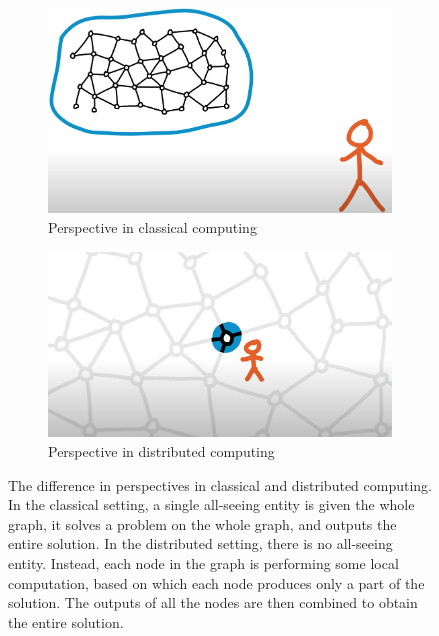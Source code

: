 \begin{figure}
  \centering
  \begin{subfigure}[b]{0.49\textwidth}
      \centering
      \includegraphics[width=\textwidth]{images/classical-computing.png}
      \caption{Perspective in classical computing}
      \label{fig:classical-computing}
  \end{subfigure}
  \hfill
  \begin{subfigure}[b]{0.49\textwidth}
      \centering
      \includegraphics[width=\textwidth]{images/distributed-computing.png}
      \caption{Perspective in distributed computing}
      \label{fig:three sin x}
  \end{subfigure}
  \caption{
    The difference in perspectives in classical and distributed computing\protect\footnotemark.
    In the classical setting, a single all-seeing entity is given the whole graph,
    it solves a problem on the whole graph, and outputs the entire solution.
    In the distributed setting, there is no all-seeing entity. Instead, each node
    in the graph is performing some local computation, based on which each node
    produces only a part of the solution. The outputs of all the nodes are then combined
    to obtain the entire solution.
  }
  \label{fig:classical-vs-distributed-computing}
\end{figure}

